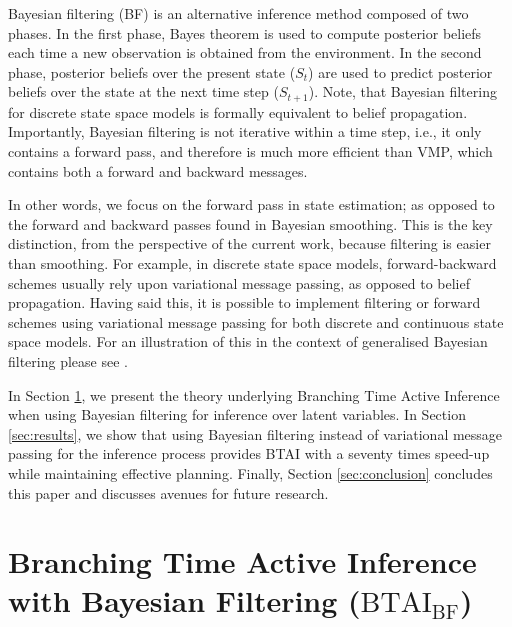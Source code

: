 \documentclass[twoside,11pt]{article}
\begin{document}
Bayesian filtering (BF) \citep{BAYESIAN_FILTERING} is an alternative inference method composed of two phases. In the first phase, Bayes theorem is used to compute posterior beliefs each time a new observation is obtained from the environment. In the second phase, posterior beliefs over the present state ($S_t$) are used to predict posterior beliefs over the state at the next time step ($S_{t+1}$). Note, that Bayesian filtering for discrete state space models is formally equivalent to belief propagation. Importantly, Bayesian filtering is not iterative within a time step, i.e., it only contains a forward pass, and therefore is much more efficient than VMP, which contains both a forward and backward messages.

In other words, we focus on the forward pass in state estimation; as opposed to the forward and backward passes found in Bayesian smoothing. This is the key distinction, from the perspective of the current work, because filtering is easier than smoothing. For example, in discrete state space models, forward-backward schemes usually rely upon variational message passing, as opposed to belief propagation. Having said this, it is possible to implement filtering or forward schemes using variational message passing for both discrete and continuous state space models. For an illustration of this in the context of generalised Bayesian filtering please see \citep{believe}.

In Section \ref{sec:ai_ts}, we present the theory underlying Branching Time Active Inference when using Bayesian filtering for inference over latent variables. In Section \ref{sec:results}, we show that using Bayesian filtering instead of variational message passing for the inference process provides BTAI with a seventy times speed-up while maintaining effective planning. Finally, Section \ref{sec:conclusion} concludes this paper and discusses avenues for future research.

\section{Branching Time Active Inference with Bayesian Filtering ($\text{BTAI}_{\text{BF}}$)} \label{sec:ai_ts}
\end{document}
